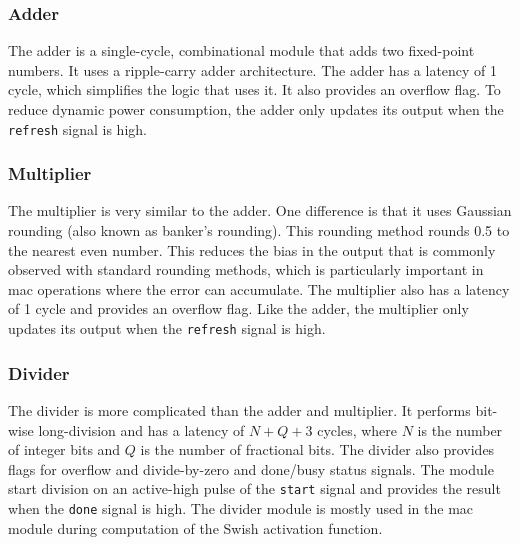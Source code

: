 \documentclass[12pt, hidelinks]{article}
\begin{document}
\subsubsection{Adder}
The adder is a single-cycle, combinational module that adds two fixed-point numbers. It uses a ripple-carry adder architecture. The adder has a latency of 1 cycle, which simplifies the logic that uses it.
It also provides an overflow flag. To reduce dynamic power consumption, the adder only updates its output when the \texttt{refresh} signal is high.

\subsubsection{Multiplier}
The multiplier is very similar to the adder. One difference is that it uses Gaussian rounding (also known as banker's rounding). This rounding method rounds 0.5 to the nearest even number. This reduces 
the bias in the output that is commonly observed with standard rounding methods, which is particularly important in \ac{mac} operations where the error can accumulate. The multiplier also has a latency of 1
cycle and provides an overflow flag. Like the adder, the multiplier only updates its output when the \texttt{refresh} signal is high.

\subsubsection{Divider}
The divider is more complicated than the adder and multiplier. It performs bit-wise long-division and has a latency of $N+Q+3$ cycles, where $N$ is the number of integer bits and $Q$ is the number of fractional
bits. The divider also provides flags for overflow and divide-by-zero and done/busy status signals. The module start division on an active-high pulse of the \texttt{start} signal and provides the result when the
\texttt{done} signal is high. The divider module is mostly used in the \ac{mac} module during computation of the Swish activation function.
\end{document}
